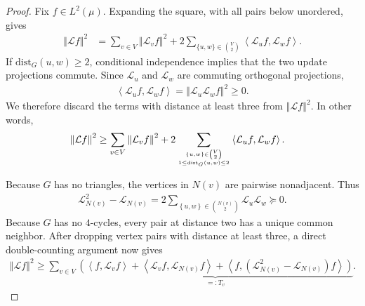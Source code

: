 \documentclass[a4paper,12pt]{article}
\theoremstyle{plain}
\theoremstyle{definition}
\def\+#1{\mathcal{#1}} %
\def\+#1{\mathcal{#1}} %
\newcommand{\dist}{\mathrm{dist}}
\newcommand{\norm}[1]{\left\Vert#1\right\Vert}
\newcommand{\set}[1]{\left\{#1\right\}}
\newcommand{\inner}[2]{\left\langle #1,#2\right\rangle}
\begin{document}
\begin{proof}
Fix $f\in L^2(\mu)$.  Expanding the square, with all pairs below
unordered, gives
\begin{align*}
  \norm{\+L f}^2
  &=\sum_{v\in V}\norm{\+L_vf}^2
    +2\sum_{\{u,w\}\in\binom{V}{2}}
      \inner{\+L_u f}{\+L_w f}.
\end{align*}
If $\dist_G(u,w)\geq2$, conditional independence implies that the two
update projections commute.  Since $\+L_u$ and $\+L_w$ are commuting
orthogonal projections,
\begin{align*}
  \inner{\+L_u f}{\+L_w f}
  =\norm{\+L_u\+L_wf}^2\geq0.
\end{align*}
We therefore discard the terms with distance at least three from $\norm{\+Lf}^2$.
In other words,
\begin{align*}
  \norm{\+L f}^2
  &\geq\sum_{v\in V}\norm{\+L_vf}^2
    +2\sum_{\{u,w\}\in\binom{V}{2} \atop 1 \leq \mathrm{dist}_G(u,w) \leq 2}
    \inner{\+L_u f}{\+L_w f}.
\end{align*}

Because $G$ has no triangles, the vertices in $N(v)$ are pairwise
nonadjacent.  Thus
\begin{align*}
  \+L_{N(v)}^2-\+L_{N(v)}
  =2\sum_{\set{u,w}\in\binom{N(v)}{2}}\+L_u\+L_w\succeq0.
\end{align*}
Because $G$ has no $4$-cycles, every pair at distance two has a unique
common neighbor.
After dropping vertex pairs with distance at least three, a direct double-counting argument now gives
\begin{align*}
  \norm{\+Lf}^2
  \geq\sum_{v\in V}\underbrace{\left(
    \inner{f}{\+L_v f}
    +\inner{\+L_vf}{\+L_{N(v)}f}
    +\inner{f}{(\+L_{N(v)}^2-\+L_{N(v)})f}
  \right)}_{=:T_v}.
\end{align*}


\end{proof}
\end{document}
